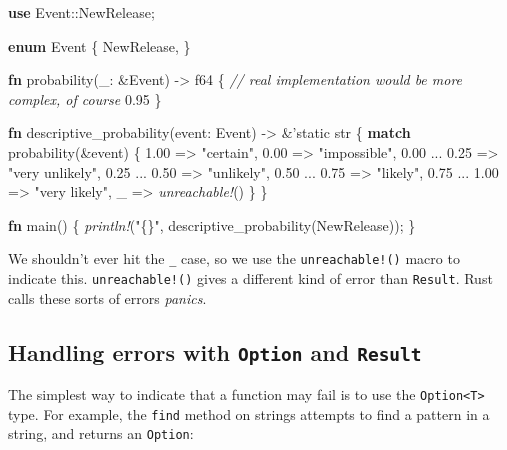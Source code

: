 \documentclass[a4paper,]{book}
\newenvironment{Shaded}{\begin{snugshade}}{\end{snugshade}}
\newcommand{\KeywordTok}[1]{\textcolor[rgb]{0.13,0.29,0.53}{\textbf{{#1}}}}
\newcommand{\DataTypeTok}[1]{\textcolor[rgb]{0.13,0.29,0.53}{{#1}}}
\newcommand{\DecValTok}[1]{\textcolor[rgb]{0.00,0.00,0.81}{{#1}}}
\newcommand{\StringTok}[1]{\textcolor[rgb]{0.31,0.60,0.02}{{#1}}}
\newcommand{\CommentTok}[1]{\textcolor[rgb]{0.56,0.35,0.01}{\textit{{#1}}}}
\newcommand{\OtherTok}[1]{\textcolor[rgb]{0.56,0.35,0.01}{{#1}}}
\newcommand{\PreprocessorTok}[1]{\textcolor[rgb]{0.56,0.35,0.01}{\textit{{#1}}}}
\newcommand{\NormalTok}[1]{{#1}}
\begin{document}
\begin{Shaded}
\begin{Highlighting}[]
\KeywordTok{use} \NormalTok{Event::NewRelease;}

\KeywordTok{enum} \NormalTok{Event \{}
    \NormalTok{NewRelease,}
\NormalTok{\}}

\KeywordTok{fn} \NormalTok{probability(_: &Event) -> }\DataTypeTok{f64} \NormalTok{\{}
    \CommentTok{// real implementation would be more complex, of course}
    \DecValTok{0.95}
\NormalTok{\}}

\KeywordTok{fn} \NormalTok{descriptive_probability(event: Event) -> &}\OtherTok{'static} \DataTypeTok{str} \NormalTok{\{}
    \KeywordTok{match} \NormalTok{probability(&event) \{}
        \DecValTok{1.00} \NormalTok{=> }\StringTok{"certain"}\NormalTok{,}
        \DecValTok{0.00} \NormalTok{=> }\StringTok{"impossible"}\NormalTok{,}
        \DecValTok{0.00} \NormalTok{... }\DecValTok{0.25} \NormalTok{=> }\StringTok{"very unlikely"}\NormalTok{,}
        \DecValTok{0.25} \NormalTok{... }\DecValTok{0.50} \NormalTok{=> }\StringTok{"unlikely"}\NormalTok{,}
        \DecValTok{0.50} \NormalTok{... }\DecValTok{0.75} \NormalTok{=> }\StringTok{"likely"}\NormalTok{,}
        \DecValTok{0.75} \NormalTok{... }\DecValTok{1.00} \NormalTok{=> }\StringTok{"very likely"}\NormalTok{,}
        \NormalTok{_ => }\PreprocessorTok{unreachable!}\NormalTok{()}
    \NormalTok{\}}
\NormalTok{\}}

\KeywordTok{fn} \NormalTok{main() \{}
    \PreprocessorTok{println!}\NormalTok{(}\StringTok{"\{\}"}\NormalTok{, descriptive_probability(NewRelease));}
\NormalTok{\}}
\end{Highlighting}
\end{Shaded}

We shouldn't ever hit the \texttt{\_} case, so we use the
\texttt{unreachable!()} macro to indicate this. \texttt{unreachable!()}
gives a different kind of error than \texttt{Result}. Rust calls these
sorts of errors \emph{panics}.

\subsection{\texorpdfstring{Handling errors with \texttt{Option} and
\texttt{Result}}{Handling errors with Option and Result}}\label{handling-errors-with-option-and-result}

The simplest way to indicate that a function may fail is to use the
\texttt{Option\textless{}T\textgreater{}} type. For example, the
\texttt{find} method on strings attempts to find a pattern in a string,
and returns an \texttt{Option}:
\end{document}
